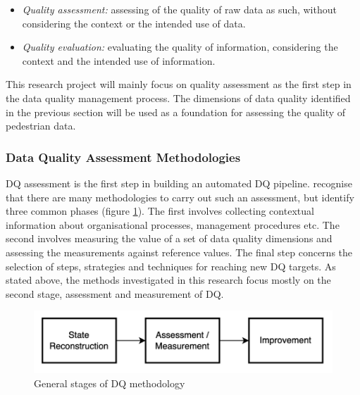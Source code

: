\begin{itemize}
    \item \textit{Quality assessment:} assessing of the quality of raw data as  such, without considering the context or the intended use of data.
    \item \textit{Quality evaluation:} evaluating the quality of information, considering the context and the intended use of information.
\end{itemize}

This research project will mainly focus on quality assessment as the first step in the data quality management process. The dimensions of data quality identified in the previous section will be used as a foundation for assessing the quality of pedestrian data.

\subsubsection{Data Quality Assessment Methodologies}
DQ assessment is the first step in building an automated DQ pipeline. \cite{batiniMethodologiesDataQuality2009} recognise that there are many methodologies to carry out such an assessment, but identify three common phases (figure \ref{fig:dp_methodology_stages}). The first involves collecting contextual information about organisational processes, management procedures etc. The second involves measuring the value of a set of data quality dimensions and assessing the measurements against reference values. The final step concerns the selection of steps, strategies and techniques for reaching new DQ targets. As stated above, the methods investigated in this research focus mostly on the second stage, assessment and measurement of DQ.

\begin{figure}[ht]
    \centering
    \includegraphics[]{figures/literature_review/dq_methodology_stages.png}
    \caption{General stages of DQ methodology \citep{batiniMethodologiesDataQuality2009}}
    \label{fig:dp_methodology_stages}
\end{figure}

